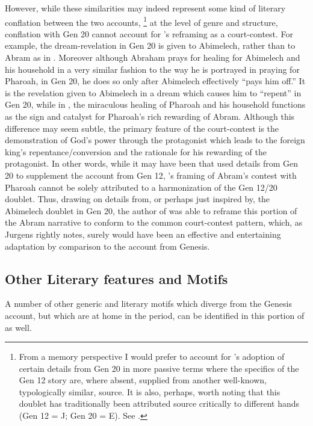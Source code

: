 However, while these similarities may indeed represent some kind of literary conflation between the two accounts,%
    \footnote{From a memory perspective I would prefer to account for \ga's adoption of certain details from Gen 20 in more passive terms where the specifics of the Gen 12 story are, where absent, supplied from another well-known, typologically similar, source. It is also, perhaps, worth noting that this doublet has traditionally been attributed source critically to different hands (Gen 12 = J; Gen 20 = E). See \cite[15]{driver1956}.} 
at the level of genre and structure, conflation with Gen 20 cannot account for \ga's reframing as a court-contest. For example, the dream-revelation in Gen 20 is given to Abimelech, rather than to Abram as in \ga. Moreover although Abraham prays for healing for Abimelech and his household in a very similar fashion to the way he is portrayed in \ga praying for Pharoah, in Gen 20, he does so only after Abimelech effectively ``pays him off.'' It is the revelation given to Abimelech in a dream which causes him to ``repent'' in Gen 20, while in \ga, the miraculous healing of Pharoah and his household functions as the sign and catalyst for Pharoah's rich rewarding of Abram. Although this difference may seem subtle, the primary feature of the court-contest is the demonstration of God's power through the protagonist which leads to the foreign king's repentance/conversion and the rationale for his rewarding of the protagonist. In other words, while it may have been that \ga used details from Gen 20 to supplement the account from Gen 12, \ga's framing of Abram's contest with Pharoah cannot be solely attributed to a harmonization of the Gen 12/20 doublet. Thus, drawing on details from, or perhaps just inspired by, the Abimelech doublet in Gen 20, the author of \ga was able to reframe this portion of the Abram narrative to conform to the common court-contest pattern, which, as Jurgens rightly notes, surely would have been an effective and entertaining adaptation by comparison to the account from Genesis.

\subsection{Other Literary features and Motifs}
A number of other generic and literary motifs which diverge from the Genesis account, but which are at home in the \secondtemple period, can be identified in this portion of \ga as well.


